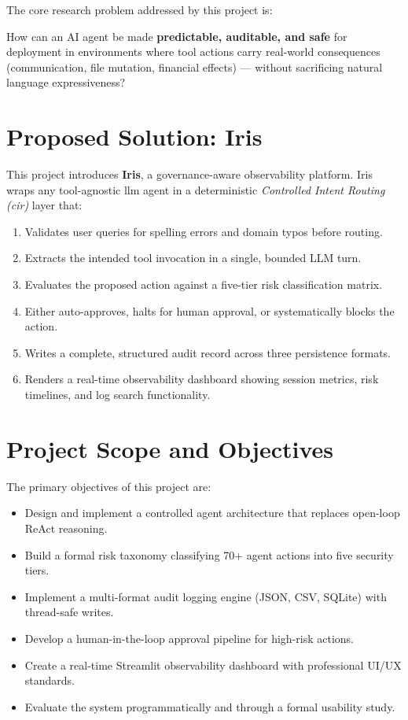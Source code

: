 The core research problem addressed by this project is:

\begin{infobox}
How can an AI agent be made \textbf{predictable, auditable, and safe} for deployment in environments where tool actions carry real-world consequences (communication, file mutation, financial effects) — without sacrificing natural language expressiveness?
\end{infobox}

\section{Proposed Solution: Iris}

This project introduces \textbf{Iris}, a governance-aware observability platform. Iris wraps any tool-agnostic \gls{llm} agent in a deterministic \textit{Controlled Intent Routing (\gls{cir})} layer that:

\begin{enumerate}[leftmargin=1.5em]
  \item Validates user queries for spelling errors and domain typos before routing.
  \item Extracts the intended tool invocation in a single, bounded LLM turn.
  \item Evaluates the proposed action against a five-tier risk classification matrix.
  \item Either auto-approves, halts for human approval, or systematically blocks the action.
  \item Writes a complete, structured audit record across three persistence formats.
  \item Renders a real-time observability dashboard showing session metrics, risk timelines, and log search functionality.
\end{enumerate}

\section{Project Scope and Objectives}

The primary objectives of this project are:

\begin{itemize}[leftmargin=1.5em]
  \item Design and implement a controlled agent architecture that replaces open-loop ReAct reasoning.
  \item Build a formal risk taxonomy classifying 70+ agent actions into five security tiers.
  \item Implement a multi-format audit logging engine (JSON, CSV, SQLite) with thread-safe writes.
  \item Develop a human-in-the-loop approval pipeline for high-risk actions.
  \item Create a real-time Streamlit observability dashboard with professional UI/UX standards.
  \item Evaluate the system programmatically and through a formal usability study.
\end{itemize}

